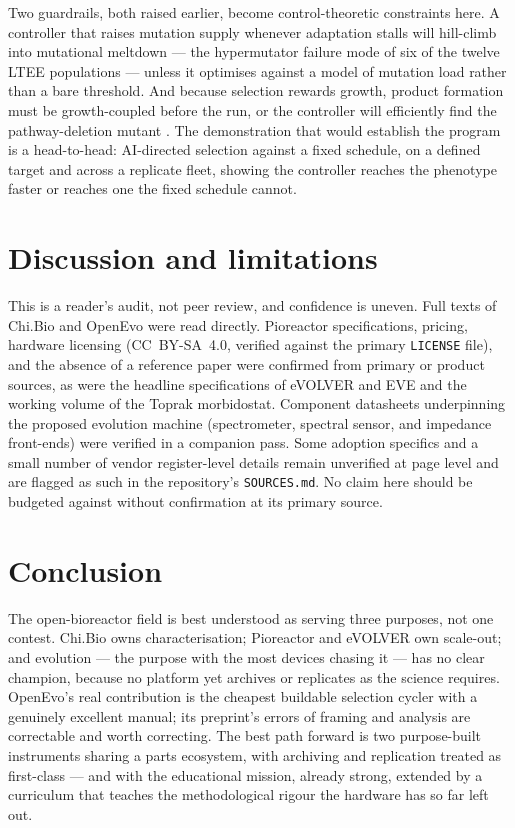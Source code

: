 \documentclass[11pt,a4paper]{article}
\newcommand{\code}[1]{\texttt{\small #1}}
\begin{document}
Two guardrails, both raised earlier, become control-theoretic constraints here. A controller that
raises mutation supply whenever adaptation stalls will hill-climb into mutational meltdown --- the
hypermutator failure mode of six of the twelve LTEE populations \cite{blount2012cit} --- unless it
optimises against a model of mutation load rather than a bare threshold. And because selection
rewards growth, product formation must be growth-coupled before the run, or the controller will
efficiently find the pathway-deletion mutant \cite{sandberg2019ale}. The demonstration that would
establish the program is a head-to-head: AI-directed selection against a fixed schedule, on a
defined target and across a replicate fleet, showing the controller reaches the phenotype faster
or reaches one the fixed schedule cannot.

\section{Discussion and limitations}
\label{sec:discussion}

This is a reader's audit, not peer review, and confidence is uneven. Full texts of Chi.Bio and
OpenEvo were read directly. Pioreactor specifications, pricing, hardware licensing
(CC~BY-SA~4.0, verified against the primary \code{LICENSE} file), and the absence of a
reference paper were confirmed from primary or product sources, as were the headline
specifications of eVOLVER and EVE and the working volume of the Toprak morbidostat. Component
datasheets underpinning the proposed evolution machine (spectrometer, spectral sensor, and
impedance front-ends) were verified in a companion pass. Some adoption specifics and a small
number of vendor register-level details remain unverified at page level and are flagged as
such in the repository's \code{SOURCES.md}. No claim here should be budgeted against without
confirmation at its primary source.

\section{Conclusion}
\label{sec:conclusion}

The open-bioreactor field is best understood as serving three purposes, not one contest.
Chi.Bio owns characterisation; Pioreactor and eVOLVER own scale-out; and evolution --- the
purpose with the most devices chasing it --- has no clear champion, because no platform yet
archives or replicates as the science requires. OpenEvo's real contribution is the cheapest
buildable selection cycler with a genuinely excellent manual; its preprint's errors of framing
and analysis are correctable and worth correcting. The best path forward is two purpose-built
instruments sharing a parts ecosystem, with archiving and replication treated as
first-class --- and with the educational mission, already strong, extended by a curriculum that
teaches the methodological rigour the hardware has so far left out.
\end{document}
